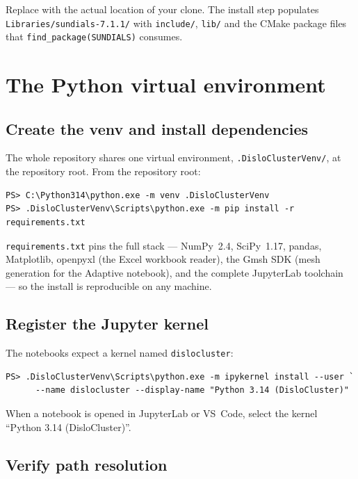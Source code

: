 \documentclass[11pt]{article}
\newcommand{\code}[1]{\texttt{\small #1}}
\newcommand{\file}[1]{\texttt{\footnotesize #1}}
\begin{document}
Replace \file{<path-to>} with the actual location of your clone. The install
step populates \file{Libraries/sundials-7.1.1/} with \file{include/},
\file{lib/} and the CMake package files that \code{find\_package(SUNDIALS)}
consumes.

\section{The Python virtual environment}
\label{sec:venv}

\subsection{Create the venv and install dependencies}

The whole repository shares one virtual environment,
\file{.DisloClusterVenv/}, at the repository root. From the repository root:

\begin{lstlisting}[style=ps]
PS> C:\Python314\python.exe -m venv .DisloClusterVenv
PS> .DisloClusterVenv\Scripts\python.exe -m pip install -r requirements.txt
\end{lstlisting}

\file{requirements.txt} pins the full stack --- NumPy~2.4, SciPy~1.17,
pandas, Matplotlib, openpyxl (the Excel workbook reader), the Gmsh SDK (mesh
generation for the Adaptive notebook), and the complete JupyterLab toolchain
--- so the install is reproducible on any machine.

\subsection{Register the Jupyter kernel}

The notebooks expect a kernel named \code{dislocluster}:

\begin{lstlisting}[style=ps]
PS> .DisloClusterVenv\Scripts\python.exe -m ipykernel install --user `
      --name dislocluster --display-name "Python 3.14 (DisloCluster)"
\end{lstlisting}

When a notebook is opened in JupyterLab or VS~Code, select the kernel
``Python 3.14 (DisloCluster)''.

\subsection{Verify path resolution}
\label{sec:pathsverify}
\end{document}
